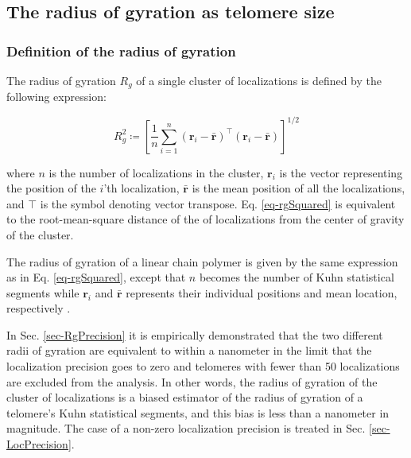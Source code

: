 \documentclass[12pt, a4paper]{article}
\begin{document}
\subsection{The radius of gyration as telomere size}
\label{sec-1-3}

\subsubsection{Definition of the radius of gyration}
\label{sec-1-3-1}
The radius of gyration $R_g$ of a single cluster of localizations
is defined by the following expression:

\begin{equation}
\label{eq-rgSquared}
R_g^2 \coloneqq \left[ \frac{1}{n} \sum_{i = 1}^{n} \left( \mathbf{r}_i - \bar{\mathbf{r}} \right)^{\intercal} \left( \mathbf{r}_i - \bar{\mathbf{r}} \right) \right]^{1/2}
\end{equation}

where $n$ is the number of localizations in the cluster,
$\mathbf{r}_i$ is the vector representing the position of the
$i$'th localization, $\bar{\mathbf{r}}$ is the mean position of all
the localizations, and $\intercal$ is the symbol denoting vector
transpose. Eq. \eqref{eq-rgSquared} is equivalent to the
root-mean-square distance of the of localizations from the center
of gravity of the cluster.

The radius of gyration of a linear chain polymer is given by the
same expression as in Eq. \eqref{eq-rgSquared}, except that $n$
becomes the number of Kuhn statistical segments while
$\mathbf{r}_i$ and $\bar{\mathbf{r}}$ represents their individual
positions and mean location, respectively
\cite{flory-statmechchainmolecules-1989}.

In Sec. \ref{sec-RgPrecision} it is empirically demonstrated that
the two different radii of gyration are equivalent to within a
nanometer in the limit that the localization precision goes to
zero and telomeres with fewer than 50 localizations are excluded
from the analysis. In other words, the radius of gyration of the
cluster of localizations is a biased estimator of the radius of
gyration of a telomere's Kuhn statistical segments, and this bias
is less than a nanometer in magnitude. The case of a non-zero
localization precision is treated in Sec. \ref{sec-LocPrecision}.
\end{document}
